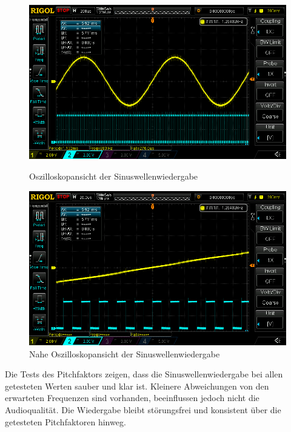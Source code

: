 \begin{figure}[H]
	\centering
	\begin{subcaptionblock}{0.49\textwidth}
		\centering
		\includegraphics[width=\textwidth]{images/10_test_validierung/audio/PCM5102a-sine-double_buffer-1kHz-false.png}
		\caption{Oszilloskopansicht der Sinuswellenwiedergabe}
		\label{fig:sinuswave-test}
	\end{subcaptionblock}
	\hfill
	\begin{subcaptionblock}{0.49\textwidth}
		\centering
		\includegraphics[width=\textwidth]{images/10_test_validierung/audio/PCM5102a-sine-double_buffer-1kHz-false-LCK.png}
		\caption{Nahe Oszilloskopansicht der Sinuswellenwiedergabe}
		\label{fig:sinuswave-test-closeup}
	\end{subcaptionblock}
\end{figure}

Die Tests des Pitchfaktors zeigen, dass die Sinuswellenwiedergabe bei allen getesteten Werten sauber und klar ist. Kleinere Abweichungen von den erwarteten Frequenzen sind vorhanden, beeinflussen jedoch nicht die Audioqualität. Die Wiedergabe bleibt störungsfrei und konsistent über die getesteten Pitchfaktoren hinweg.

